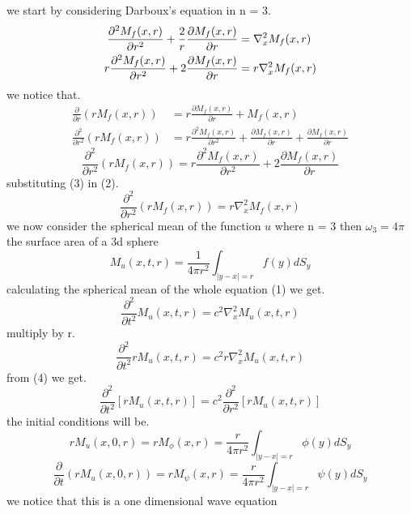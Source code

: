 we start by considering Darboux's equation in n = 3.
\begin{align}
\frac{\partial^2 M_f (x,r)}{\partial r^2} + \frac{2}{r} \frac{\partial M_f (x,r)}{\partial r} &= \nabla_{x}^{2} M_f (x,r) \notag
\\ 
r\frac{\partial^2 M_f (x,r)}{\partial r^2} + 2 \frac{\partial M_f (x,r)}{\partial r} &= r\nabla_{x}^{2} M_f (x,r)
\end{align}
we notice that.
\begin{align*}
\frac{\partial }{\partial r}\left(rM_f (x,r) \right) &= r\frac{\partial M_f(x,r)}{\partial r} +M_f (x,r)
\\
\frac{\partial^2 }{\partial r^2}\left(rM_f (x,r) \right) &= r\frac{\partial^2 M_f(x,r)}{\partial r^2} + \frac{\partial M_f(x,r)}{\partial r}  + \frac{\partial M_f(x,r)}{\partial r}
\end{align*}
\begin{equation}
\frac{\partial^2 }{\partial r^2}\left(rM_f (x,r) \right) = r\frac{\partial^2 M_f(x,r)}{\partial r^2} + 2\frac{\partial M_f(x,r)}{\partial r}
\end{equation}
substituting (3) in (2).
\begin{equation}
\frac{\partial^2 }{\partial r^2}\left(rM_f (x,r) \right) = r\nabla_{x}^{2} M_f (x,r)
\end{equation}
we now consider the spherical mean of the function $u$ where n = 3 then $\omega_3 = 4\pi$ the surface area of a 3d sphere
\[
    M_{u}(x,t,r) = \frac{1}{4\pi r^2} \int_{|y-x|=r} f(y)dS_y    
\]
calculating the spherical mean of the whole equation (1) we get.
\[
    \frac{\partial^2}{\partial t^2} M_{u}(x,t,r) = c^2 \nabla_{x}^{2}M_{u}(x,t,r)    
\]
multiply by r.
\[
    \frac{\partial^2}{\partial t^2} r M_{u}(x,t,r) = c^2 r\nabla_{x}^{2}M_{u}(x,t,r)    
\]
from (4) we get.
\begin{equation}
    \frac{\partial^2}{\partial t^2} \left[r M_u (x,t,r) \right] = c^2 \frac{\partial^2 }{\partial r^2}\left[r M_u (x,t,r) \right]    
\end{equation} 
the initial conditions will be.
\begin{equation}
rM_{u}(x,0,r) = rM_\phi(x,r) = \frac{r}{4\pi r^2} \int_{|y-x|=r}\phi(y)dS_y
\end{equation}
\begin{equation}
\frac{\partial}{\partial t}\left(rM_{u}(x,0,r)\right) = rM_\psi(x,r) = \frac{r}{4\pi r^2} \int_{|y-x|=r}\psi(y)dS_y
\end{equation}
we notice that this is a one dimensional wave equation 

